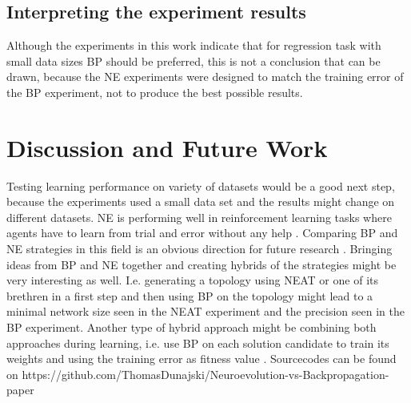 \documentclass{llncs}
\begin{document}
%
\subsection{Interpreting the experiment results}
  Although the experiments in this work indicate that for regression task with small data sizes BP should be preferred, this is not a conclusion that can be drawn, because the NE experiments were designed to match the training error of the BP experiment, not to produce the best possible results. 
%
%
\section{Discussion and Future Work}
%
Testing learning performance on variety of datasets would be a good next step, because the experiments used a small data set and the results might change on different datasets. NE is performing well in reinforcement learning tasks where agents have to learn from trial and error without any help \cite{Stanley.2019}. Comparing BP and NE strategies in this field is an obvious direction for future research \cite{Salimans.11.03.2017}.  
\newline
Bringing ideas from BP and NE together and creating hybrids of the strategies might be very interesting as well. I.e. generating a topology using NEAT or one of its brethren in a first step and then using BP on the topology might lead to a minimal network size seen in the NEAT experiment and the precision seen in the BP experiment. Another type of hybrid approach might be combining both approaches during learning, i.e. use BP on each solution candidate to train its weights and using the training error as fitness value \cite{Desell.16.03.2017}. 
%
%
\newline
\newline
\newline
Sourcecodes can be found on https://github.com/ThomasDunajski/Neuroevolution-vs-Backpropagation-paper
%
%






\end{document}
